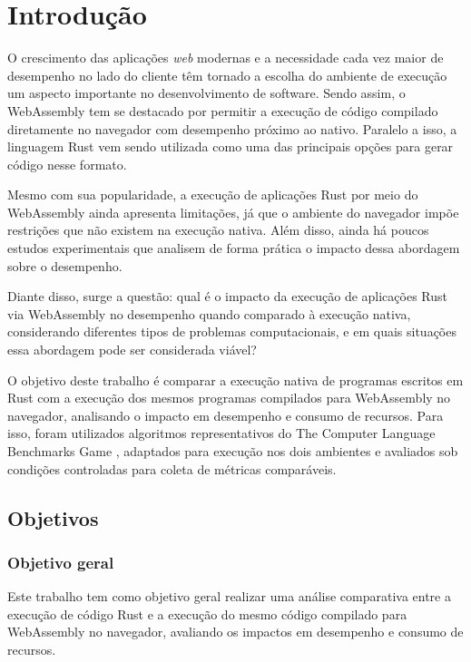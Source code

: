 \chapter{Introdução}

O crescimento das aplicações \emph{web} modernas e a necessidade cada vez maior de desempenho no lado do cliente têm tornado a escolha do ambiente de execução um aspecto importante no desenvolvimento de software. Sendo assim, o WebAssembly tem se destacado por permitir a execução de código compilado diretamente no navegador com desempenho próximo ao nativo. Paralelo a isso, a linguagem Rust vem sendo utilizada como uma das principais opções para gerar código nesse formato.

Mesmo com sua popularidade, a execução de aplicações Rust por meio do WebAssembly ainda apresenta limitações, já que o ambiente do navegador impõe restrições que não existem na execução nativa. Além disso, ainda há poucos estudos experimentais que analisem de forma prática o impacto dessa abordagem sobre o desempenho.

Diante disso, surge a questão: qual é o impacto da execução de aplicações Rust via WebAssembly no desempenho quando comparado à execução nativa, considerando diferentes tipos de problemas computacionais, e em quais situações essa abordagem pode ser considerada viável?

O objetivo deste trabalho é comparar a execução nativa de programas escritos em Rust com a execução dos mesmos programas compilados para WebAssembly no navegador, analisando o impacto em desempenho e consumo de recursos. Para isso, foram utilizados algoritmos representativos do The Computer Language Benchmarks Game \cite{bench2026}, adaptados para execução nos dois ambientes e avaliados sob condições controladas para coleta de métricas comparáveis. 

\section{Objetivos}

\subsection {Objetivo geral}

Este trabalho tem como objetivo geral realizar uma análise comparativa entre a execução de código Rust e a execução do mesmo código compilado para WebAssembly no navegador, avaliando os impactos em desempenho e consumo de recursos.

